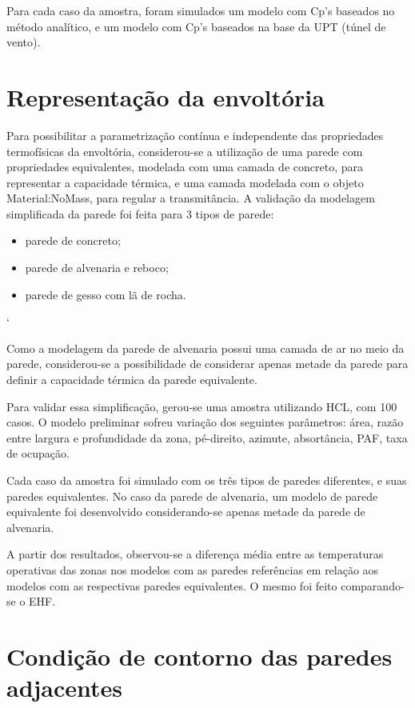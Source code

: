 \documentclass[brazil,hardcopy,openany,a5paper]{ufscthesis}
\begin{document}
		Para cada caso da amostra, foram simulados um modelo com Cp’s baseados no método analítico, e um modelo com Cp’s baseados na base da UPT (túnel de vento).
		
		\section{Representação da envoltória}
		
		Para possibilitar a parametrização contínua e independente das propriedades termofísicas da envoltória, considerou-se a utilização de uma parede com propriedades equivalentes, modelada com uma camada de concreto, para representar a capacidade térmica, e uma camada modelada com o objeto Material:NoMass, para regular a transmitância.
		A validação da modelagem simplificada da parede foi feita para 3 tipos de parede:
		
		\begin{itemize}
			\item parede de concreto;
			\item parede de alvenaria e reboco;
			\item parede de gesso com lã de rocha.
		\end{itemize}`
		
		Como a modelagem da parede de alvenaria possui uma camada de ar no meio da parede, considerou-se a possibilidade de considerar apenas metade da parede para definir a capacidade térmica da parede equivalente.
		
		Para validar essa simplificação, gerou-se uma amostra utilizando HCL, com 100 casos. O modelo preliminar sofreu variação dos seguintes parâmetros: área, razão entre largura e profundidade da zona, pé-direito, azimute, absortância, PAF, taxa de ocupação.
		
		Cada caso da amostra foi simulado com os três tipos de paredes diferentes, e suas paredes equivalentes. No caso da parede de alvenaria, um modelo de parede equivalente foi desenvolvido considerando-se apenas metade da parede de alvenaria.
		
		A partir dos resultados, observou-se a diferença média entre as temperaturas operativas das zonas nos modelos com as paredes referências em relação aos modelos com as respectivas paredes equivalentes. O mesmo foi feito comparando-se o EHF.
		
		\section{Condição de contorno das paredes adjacentes}
		
\end{document}
